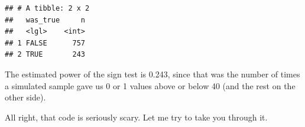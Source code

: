 \documentclass[]{tufte-book}
\newenvironment{Shaded}{}{}
\newcommand{\DataTypeTok}[1]{\textcolor[rgb]{0.56,0.13,0.00}{#1}}
\newcommand{\DecValTok}[1]{\textcolor[rgb]{0.25,0.63,0.44}{#1}}
\newcommand{\KeywordTok}[1]{\textcolor[rgb]{0.00,0.44,0.13}{\textbf{#1}}}
\newcommand{\NormalTok}[1]{#1}
\newcommand{\OperatorTok}[1]{\textcolor[rgb]{0.40,0.40,0.40}{#1}}
\newcommand{\StringTok}[1]{\textcolor[rgb]{0.25,0.44,0.63}{#1}}
\theoremstyle{definition}
\theoremstyle{definition}
\theoremstyle{definition}
\theoremstyle{remark}
\begin{document}
\begin{Shaded}
\end{Shaded}

\begin{verbatim}
## # A tibble: 2 x 2
##   was_true     n
##   <lgl>    <int>
## 1 FALSE      757
## 2 TRUE       243
\end{verbatim}

The estimated power of the sign test is 0.243, since that was the number
of times a simulated sample gave us 0 or 1 values above or below 40 (and
the rest on the other side).

All right, that code is seriously scary. Let me try to take you through
it.
\end{document}
